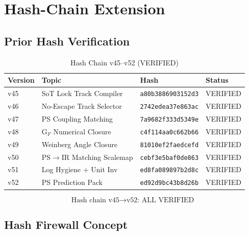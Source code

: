 \documentclass[11pt,a4paper]{article}
\theoremstyle{definition}
\begin{document}
\section{Hash-Chain Extension}
\label{sec:hash}

\subsection{Prior Hash Verification}
\label{subsec:prior_hashes}

\begin{table}[h]
\centering
\caption{Hash Chain v45--v52 (VERIFIED)}
\label{tab:hash_chain}
\begin{tabular}{@{}llll@{}}
\toprule
\textbf{Version} & \textbf{Topic} & \textbf{Hash} & \textbf{Status} \\
\midrule
v45 & SoT Lock Track Compiler & \texttt{a80b3886903152d3} & VERIFIED \\
v46 & No-Escape Track Selector & \texttt{2742edea37e863ac} & VERIFIED \\
v47 & PS Coupling Matching & \texttt{7a9682f333d5349e} & VERIFIED \\
v48 & G$_F$ Numerical Closure & \texttt{c4f114aa0c662b66} & VERIFIED \\
v49 & Weinberg Angle Closure & \texttt{81010ef2faedcefd} & VERIFIED \\
v50 & PS$\to$IR Matching Scalemap & \texttt{cebf3e5baf0de863} & VERIFIED \\
v51 & Log Hygiene + Unit Inv & \texttt{ed8fa089897b2d8c} & VERIFIED \\
v52 & PS Prediction Pack & \texttt{ed92d9bc43b8d26b} & VERIFIED \\
\bottomrule
\end{tabular}
\end{table}

\begin{equation}
\label{eq:hash_chain_verified}
\text{Hash chain v45} \to \text{v52: ALL VERIFIED}
\end{equation}

\subsection{Hash Firewall Concept}
\label{subsec:hash_firewall}
\end{document}
